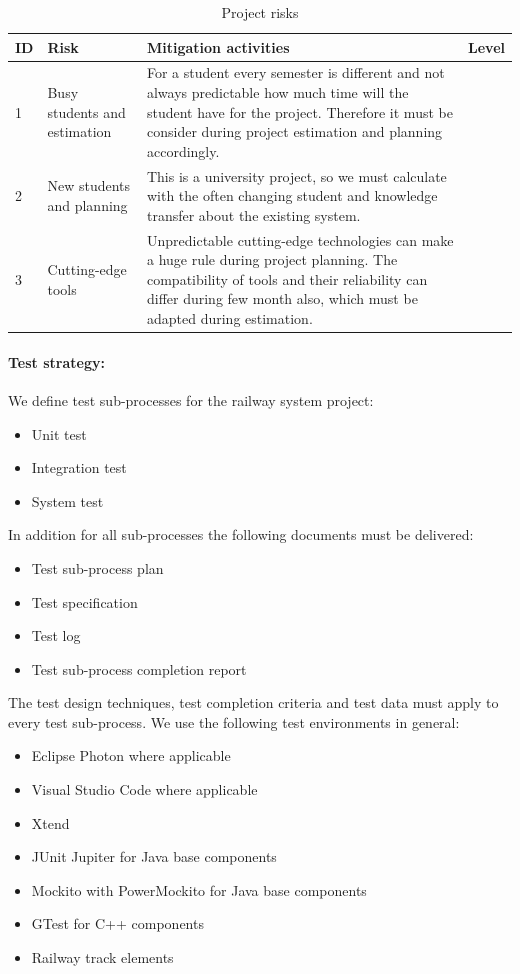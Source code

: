 \begin{table}[!h]
	\caption{Project risks}
	\label{table:Project-risks}
	\begin{center}
		\renewcommand{\arraystretch}{1.8}
		\begin{tabu} 
			to 0.9 \textwidth
			{ X[0.1, c] X[0.5, l] X[l] X[0.4, l] }
			\toprule
			ID & Risk & Mitigation activities & Level \\  & Busy students and estimation & For a student every semester is different and not always predictable how much time will the student have for the project. Therefore it must be consider during project estimation and planning accordingly.     &  \\ 
			2 & New students and planning & This is a university project, so we must calculate with the often changing student and knowledge transfer about the existing system.& \\
			3 & Cutting-edge tools & Unpredictable cutting-edge technologies can make a huge rule during project planning. The compatibility of tools and their reliability can differ during few month also, which must be adapted during estimation. & \\ \bottomrule
		\end{tabu}
	\end{center}
\end{table}

\paragraph{Test strategy:} 
We define test sub-processes for the railway system project:
\begin{itemize}
	\item Unit test
	\item Integration test
	\item System test
\end{itemize}
In addition for all sub-processes the following documents must be delivered:
\begin{itemize}
	\item Test sub-process plan
	\item Test specification
	\item Test log
	\item Test sub-process completion report
\end{itemize}
The test design techniques, test completion criteria and test data must apply to every test sub-process. We use the following test environments in general:
\begin{itemize}
	\item Eclipse Photon where applicable
	\item Visual Studio Code where applicable
	\item Xtend 
	\item JUnit Jupiter for Java base components
	\item Mockito with PowerMockito for Java base components
	\item GTest for C++ components
	\item Railway track elements
\end{itemize}
